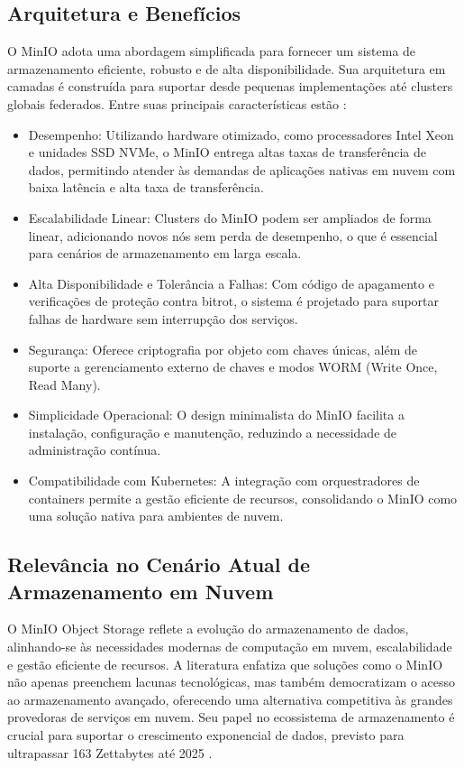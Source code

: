 \subsection{Arquitetura e Benefícios}
O MinIO adota uma abordagem simplificada para fornecer um sistema de armazenamento eficiente, robusto e de alta disponibilidade. Sua arquitetura em camadas é construída para suportar desde pequenas implementações até clusters globais federados. Entre suas principais características estão \cite{minio_reference_architecture}:
\begin{itemize}
    \item Desempenho: Utilizando hardware otimizado, como processadores Intel Xeon e unidades SSD NVMe, o MinIO entrega altas taxas de transferência de dados, permitindo atender às demandas de aplicações nativas em nuvem com baixa latência e alta taxa de transferência.
    \item Escalabilidade Linear: Clusters do MinIO podem ser ampliados de forma linear, adicionando novos nós sem perda de desempenho, o que é essencial para cenários de armazenamento em larga escala.
    \item Alta Disponibilidade e Tolerância a Falhas: Com código de apagamento e verificações de proteção contra bitrot, o sistema é projetado para suportar falhas de hardware sem interrupção dos serviços.
    \item Segurança: Oferece criptografia por objeto com chaves únicas, além de suporte a gerenciamento externo de chaves e modos WORM (Write Once, Read Many).
    \item Simplicidade Operacional: O design minimalista do MinIO facilita a instalação, configuração e manutenção, reduzindo a necessidade de administração contínua.
    \item Compatibilidade com Kubernetes: A integração com orquestradores de containers permite a gestão eficiente de recursos, consolidando o MinIO como uma solução nativa para ambientes de nuvem.
\end{itemize}

\subsection{Relevância no Cenário Atual de Armazenamento em Nuvem}
O MinIO Object Storage reflete a evolução do armazenamento de dados, alinhando-se às necessidades modernas de computação em nuvem, 
escalabilidade e gestão eficiente de recursos. A literatura enfatiza que soluções como o MinIO não apenas preenchem lacunas tecnológicas, 
mas também democratizam o acesso ao armazenamento avançado, oferecendo uma alternativa competitiva às grandes provedoras de serviços 
em nuvem. Seu papel no ecossistema de armazenamento é crucial para suportar o crescimento exponencial de dados, previsto para 
ultrapassar 163 Zettabytes até 2025 \cite{minio_reference_architecture}.



